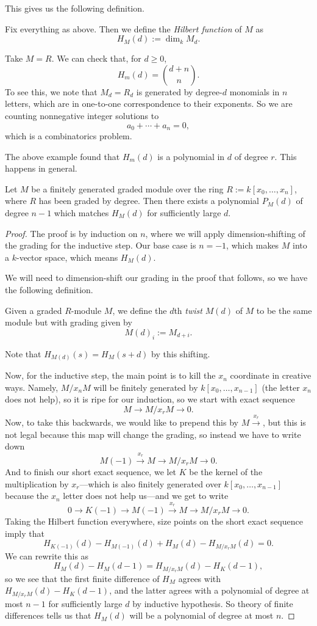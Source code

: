 This gives us the following definition.
\begin{definition}
	Fix everything as above. Then we define the \textit{Hilbert function} of $M$ as
	\[H_M(d):=\dim_kM_d.\]
\end{definition}
\begin{example}
	Take $M=R$. We can check that, for $d\ge0$,
	\[H_m(d)=\binom{d+n}{n}.\]
	To see this, we note that $M_d=R_d$ is generated by degree-$d$ monomials in $n$ letters, which are in one-to-one correspondence to their exponents. So we are counting nonnegative integer solutions to
	\[a_0+\cdots+a_n=0,\]
	which is a combinatorics problem.
\end{example}
The above example found that $H_m(d)$ is a polynomial in $d$ of degree $r$. This happens in general.
\begin{theorem}
	Let $M$ be a finitely generated graded module over the ring $R:=k[x_0,\ldots,x_n]$, where $R$ has been graded by degree. Then there exists a polynomial $P_M(d)$ of degree $n-1$ which matches $H_M(d)$ for sufficiently large $d$.
\end{theorem}
\begin{proof}
	The proof is by induction on $n$, where we will apply dimension-shifting of the grading for the inductive step. Our base case is $n=-1$, which makes $M$ into a $k$-vector space, which means $H_M(d)$.

	We will need to dimension-shift our grading in the proof that follows, so we have the following definition.
	\begin{definition}[Twist]
		Given a graded $R$-module $M$, we define the $d$th \textit{twist} $M(d)$ of $M$ to be the same module but with grading given by
		\[M(d)_i:=M_{d+i}.\]
	\end{definition}
	Note that $H_{M(d)}(s)=H_M(s+d)$ by this shifting.

	Now, for the inductive step, the main point is to kill the $x_n$ coordinate in creative ways. Namely, $M/x_nM$ will be finitely generated by $k[x_0,\ldots,x_{n-1}]$ (the letter $x_n$ does not help), so it is ripe for our induction, so we start with exact sequence
	\[M\to M/x_rM\to 0.\]
	Now, to take this backwards, we would like to prepend this by $M\stackrel{x_r}\to$, but this is not legal because this map will change the grading, so instead we have to write down
	\[M(-1)\stackrel{x_r}\to M\to M/x_rM\to 0.\]
	And to finish our short exact sequence, we let $K$ be the kernel of the multiplication by $x_r$---which is also finitely generated over $k[x_0,\ldots,x_{n-1}]$ because the $x_n$ letter does not help us---and we get to write
	\[0\to K(-1)\to M(-1)\stackrel{x_r}\to M\to M/x_rM\to 0.\]
	Taking the Hilbert function everywhere, size points on the short exact sequence imply that
	\[H_{K(-1)}(d)-H_{M(-1)}(d)+H_M(d)-H_{M/x_rM}(d)=0.\]
	We can rewrite this as
	\[H_M(d)-H_M(d-1)=H_{M/x_rM}(d)-H_K(d-1),\]
	so we see that the first finite difference of $H_M$ agrees with $H_{M/x_rM}(d)-H_K(d-1)$, and the latter agrees with a polynomial of degree at most $n-1$ for sufficiently large $d$ by inductive hypothesis. So theory of finite differences tells us that $H_M(d)$ will be a polynomial of degree at most $n$.
\end{proof}
